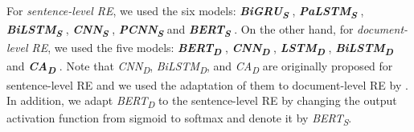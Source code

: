 \documentclass[11pt]{article}
\newcommand{\minisection}[1]{\vspace{0.03in}{\bf \noindent #1.} }
\newcommand{\red}[1]{{\color{red} #1}}
\newcommand{\dcnn}{\emph{CNN\textsubscript{D}}\xspace}
\newcommand{\dlstm}{\emph{LSTM\textsubscript{D}}\xspace}
\newcommand{\dca}{\emph{CA\textsubscript{D}}\xspace}
\newcommand{\dbilstm}{\emph{BiLSTM\textsubscript{D}}\xspace}
\newcommand{\dbert}{\emph{BERT\textsubscript{D}}\xspace}
\newcommand{\sbilstm}{\emph{BiLSTM\textsubscript{S}}\xspace}
\newcommand{\scnn}{\emph{CNN\textsubscript{S}}\xspace}
\newcommand{\sbigru}{\emph{BiGRU\textsubscript{S}}\xspace}
\newcommand{\spcnn}{\emph{PCNN\textsubscript{S}}\xspace}
\newcommand{\spalstm}{\emph{PaLSTM\textsubscript{S}}\xspace}
\newcommand{\sbert}{\emph{BERT\textsubscript{S}}\xspace}
\begin{document}
\minisection{Used relation extraction models} 
For \emph{sentence-level RE}, we used the six models: \textbf{\sbigru}  \cite{zhang2017position}, \textbf{\spalstm} \cite{zhang2017position}, \textbf{\sbilstm} \cite{zhang2017position}, \textbf{\scnn} \cite{zeng2014relation}, \textbf{\spcnn} \cite{zeng2015distant} and \textbf{\sbert} \cite{wang2019fine}.
On the other hand, for \emph{document-level RE}, we used the five models:
\textbf{\dbert} \cite{wang2019fine}, \textbf{\dcnn} \cite{zeng2014relation}, \textbf{\dlstm} \cite{yao2019docred}, \textbf{\dbilstm} \cite{cai2016bidirectional} and \textbf{\dca} \cite{sorokin2017context}.
Note that \dcnn, \dbilstm, and \dca are originally proposed for sentence-level RE 
and we used the adaptation of them to document-level RE by .
In addition, we adapt \dbert to the sentence-level RE by changing the output activation function from sigmoid to softmax and denote it by \sbert.

 
















\iffalse
\red{
Previous works also reported F1-Ign and AUC-Ign to evaluate the models to ignore the relational facts in train data.\\
Option 1:\\
However, we do not report the scores in detail since the scores are not properly defined to ignore the effect of the train data.
We will discuss the problem in the supplementary materials.\\
Option 2:\\
Due to the lack of space, we will report the result in the supplementary materials.
\\
Instead, we simply report here that our proposed model also increased the F1-Ign and AUC-Ign scores at least 11.7\% and 16.0\%, respectively, compared to the existing models.}
\fi


 
\end{document}

